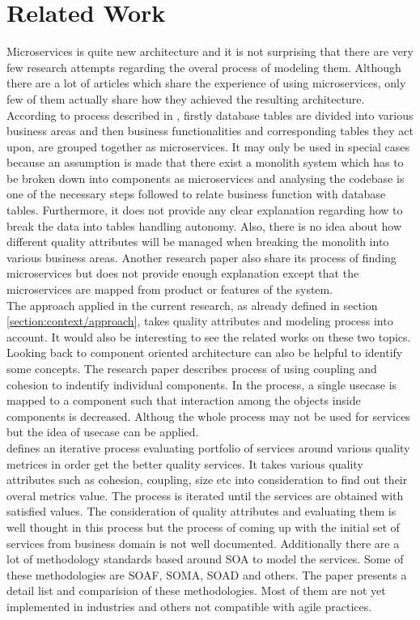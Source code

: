 \chapter{Related Work}\label{chapter:related_work}
Microservices is quite new architecture and it is not surprising that there are very few research attempts regarding the overal process of modeling them. Although there are a lot of articles which share the experience of using microservices, only few of them actually share how they achieved the resulting architecture. According to process described in \cite{Levcovitz:2014aa}, firstly database tables are divided into various business areas and then business functionalities and corresponding tables they act upon, are grouped together as microservices. It may only be used in special cases because an assumption is made that there exist a monolith system which has to be broken down into components as microservices and analysing the codebase is one of the necessary steps followed to relate business function with database tables. Furthermore, it does not provide any clear explanation regarding how to break the data into tables handling autonomy. Also, there is no idea about how different quality attributes will be managed when breaking the monolith into various business areas. Another research paper \cite{Bruggemann:2013aa} also share its process of finding microservices but does not provide enough explanation except that the microservices are mapped from product or features of the system.
\\
The approach applied in the current research, as already defined in section \ref{section:context/approach}, takes quality attributes and modeling process into account. It would also be interesting to see the related works on these two topics.\\
Looking back to component oriented architecture can also be helpful to identify some concepts. The research paper \cite{Lee:2001aa} describes process of using coupling and cohesion to indentify individual components. In the process, a single usecase is mapped to a component such that interaction among the objects inside components is decreased. Althoug the whole process may not be used for services but the idea of usecase can be applied.\\
\cite{Ma:2009aa} defines an iterative process evaluating portfolio of services around various quality metrices in order get the better quality services. It takes various quality attributes such as cohesion, coupling, size etc into consideration to find out their overal metrics value. The process is iterated until the services are obtained with satisfied values. The consideration of quality attributes and evaluating them is well thought in this process but the process of coming up with the initial set of services from business domain is not well documented.
Additionally there are a lot of methodology standards based around \acrshort{SOA} to model the services. Some of these methodologies are \acrshort{SOAF}, \acrshort{SOMA}, \acrshort{SOAD} and others. The paper presents a detail list and comparision of these methodologies. Most of them are not yet implemented in industries and others not compatible with agile practices.